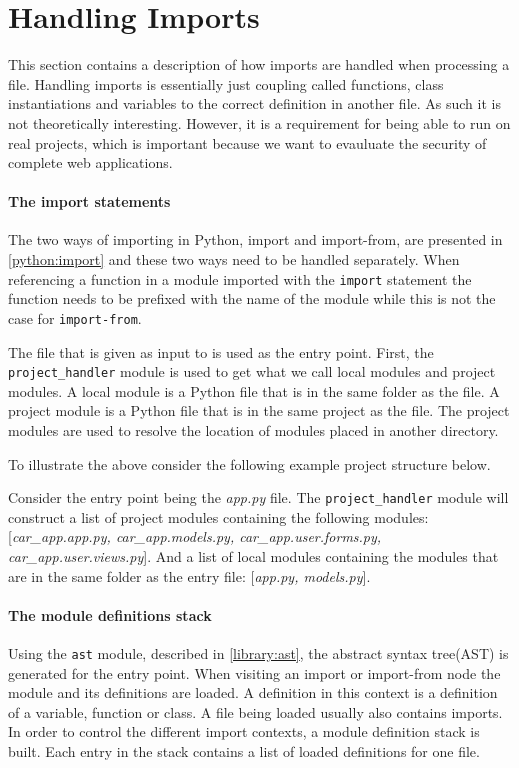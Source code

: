 \section{Handling Imports}
This section contains a description of how imports are handled when processing a file.
Handling imports is essentially just coupling called functions, class instantiations and variables to the correct definition in another file.
As such it is not theoretically interesting.
However, it is a requirement for being able to run \pyt{} on real projects, which is important because we want to evauluate the security of complete web applications.

\paragraph{The import statements}
The two ways of importing in Python, import and import-from, are presented in \cref{python:import} and these two ways need to be handled separately.
When referencing a function in a module imported with the \texttt{import} statement the function needs to be prefixed with the name of the module while this is not the case for \texttt{import-from}.


The file that is given as input to \pyt{} is used as the entry point.
First, the \texttt{project\_handler} module is used to get what we call local modules and project modules.
A local module is a Python file that is in the same folder as the file.
A project module is a Python file that is in the same project as the file.
The project modules are used to resolve the location of modules placed in another directory.

To illustrate the above consider the following example project structure below.

\hfill
{}  
\hfill

Consider the entry point being the \textit{app.py} file.
The \texttt{project\_handler} module will construct a list of project modules containing the following modules: [\textit{car\_app.app.py, car\_app.models.py, car\_app.user.forms.py, car\_app.user.views.py}].
And a list of local modules containing the modules that are in the same folder as the entry file: [\textit{app.py, models.py}].

\paragraph{The module definitions stack}
Using the \texttt{ast} module, described in \cref{library:ast}, the abstract syntax tree(AST) is generated for the entry point.
When visiting an import or import-from node the module and its definitions are loaded.
A definition in this context is a definition of a variable, function or class.
A file being loaded usually also contains imports.
In order to control the different import contexts, a module definition stack is built.
Each entry in the stack contains a list of loaded definitions for one file.

